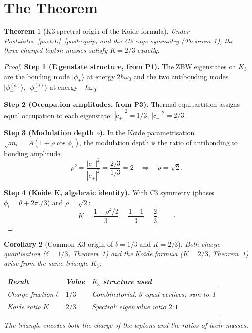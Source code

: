 \documentclass[11pt]{article}
\newtheorem{theorem}{Theorem}[section]
\newtheorem{corollary}[theorem]{Corollary}
\begin{document}
\section{The Theorem}

\begin{theorem}[K3 spectral origin of the Koide formula]
\label{thm:K3Koide}
Under Postulates~\ref{post:H}--\ref{post:equip} and the C3 cage symmetry
(Theorem~1), the three charged lepton masses satisfy $K = 2/3$ exactly.
\end{theorem}

\begin{proof}
\textbf{Step 1 (Eigenstate structure, from P1).}
The ZBW eigenstates on $K_3$ are the bonding mode $|\phi_+\rangle$ at energy
$2\hbar\omega_0$ and the two antibonding modes $|\phi_-^{(a)}\rangle$,
$|\phi_-^{(b)}\rangle$ at energy $-\hbar\omega_0$.

\textbf{Step 2 (Occupation amplitudes, from P3).}
Thermal equipartition assigns equal occupation to each eigenstate:
$|c_+|^2 = 1/3$, $|c_-|^2 = 2/3$.

\textbf{Step 3 (Modulation depth $\rho$).}
In the Koide parametrisation $\sqrt{m_i} = A(1+\rho\cos\phi_i)$,
the modulation depth is the ratio of antibonding to bonding amplitude:
\[
\rho^2 = \frac{|c_-|^2}{|c_+|^2} = \frac{2/3}{1/3} = 2
\quad\Rightarrow\quad \rho = \sqrt{2}.
\]

\textbf{Step 4 (Koide K, algebraic identity).}
With C3 symmetry (phases $\phi_i = \theta + 2\pi i/3$) and $\rho = \sqrt{2}$:
\[
K = \frac{1 + \rho^2/2}{3} = \frac{1 + 1}{3} = \frac{2}{3}.\qquad\square
\]
\end{proof}

\begin{corollary}[Common K3 origin of $\delta = 1/3$ and $K = 2/3$]
\label{cor:common}
Both charge quantisation ($\delta = 1/3$, Theorem~1) and the Koide formula
($K = 2/3$, Theorem~\ref{thm:K3Koide}) arise from the same triangle $K_3$:
\begin{center}
\begin{tabular}{lll}
\toprule
Result & Value & $K_3$ structure used \\
\midrule
Charge fraction $\delta$ & $1/3$ & Combinatorial: 3 equal vertices, sum to~1 \\
Koide ratio $K$ & $2/3$ & Spectral: eigenvalue ratio $2:1$ \\
\bottomrule
\end{tabular}
\end{center}
The triangle encodes both the charge of the leptons and the ratios of their masses.
\end{corollary}
\end{document}
